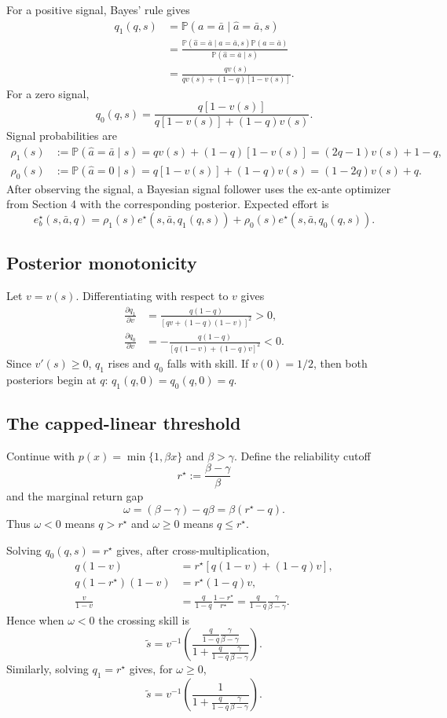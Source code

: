 \documentclass[11pt]{article}
\theoremstyle{tutorial}
\theoremstyle{remark}
\newcommand{\Pp}{\mathbb{P}}
\newcommand{\1}{\mathbb{I}}
\begin{document}
For a positive signal, Bayes' rule gives
\begin{align*}
q_1(q,s)
&=\Pp(a=\bar a\mid\hat a=\bar a,s)\\
&=\frac{\Pp(\hat a=\bar a\mid a=\bar a,s)\Pp(a=\bar a)}
{\Pp(\hat a=\bar a\mid s)}\\
&=\frac{qv(s)}{qv(s)+(1-q)[1-v(s)]}.
\end{align*}
For a zero signal,
\[
q_0(q,s)=\frac{q[1-v(s)]}{q[1-v(s)]+(1-q)v(s)}.
\]
Signal probabilities are
\begin{align*}
\rho_1(s)&:=\Pp(\hat a=\bar a\mid s)=qv(s)+(1-q)[1-v(s)]
=(2q-1)v(s)+1-q,\\
\rho_0(s)&:=\Pp(\hat a=0\mid s)=q[1-v(s)]+(1-q)v(s)
=(1-2q)v(s)+q.
\end{align*}
After observing the signal, a Bayesian signal follower uses the ex-ante optimizer from Section 4 with the
corresponding posterior.  Expected effort is
\[
e_b^\star(s,\bar a,q)=
\rho_1(s)e^\star(s,\bar a,q_1(q,s))+
\rho_0(s)e^\star(s,\bar a,q_0(q,s)).
\]

\subsection{Posterior monotonicity}

Let $v=v(s)$.  Differentiating with respect to $v$ gives
\begin{align*}
\frac{\partial q_1}{\partial v}
&=\frac{q(1-q)}{[qv+(1-q)(1-v)]^2}>0,\\
\frac{\partial q_0}{\partial v}
&=-\frac{q(1-q)}{[q(1-v)+(1-q)v]^2}<0.
\end{align*}
Since $v'(s)\ge0$, $q_1$ rises and $q_0$ falls with skill.  If $v(0)=1/2$, then both posteriors begin at
$q$: $q_1(q,0)=q_0(q,0)=q$.

\subsection{The capped-linear threshold}

Continue with $p(x)=\min\{1,\beta x\}$ and $\beta>\gamma$.  Define the reliability cutoff
\[
r^\star:=\frac{\beta-\gamma}{\beta}
\]
and the marginal return gap
\[
\omega=(\beta-\gamma)-q\beta=\beta(r^\star-q).
\]
Thus $\omega<0$ means $q>r^\star$ and $\omega\ge0$ means $q\le r^\star$.

Solving $q_0(q,s)=r^\star$ gives, after cross-multiplication,
\begin{align*}
q(1-v)&=r^\star[q(1-v)+(1-q)v],\\
q(1-r^\star)(1-v)&=r^\star(1-q)v,\\
\frac{v}{1-v}&=\frac{q}{1-q}\frac{1-r^\star}{r^\star}
=\frac{q}{1-q}\frac{\gamma}{\beta-\gamma}.
\end{align*}
Hence when $\omega<0$ the crossing skill is
\[
\tilde s=v^{-1}\!\left(
\frac{\frac{q}{1-q}\frac{\gamma}{\beta-\gamma}}
{1+\frac{q}{1-q}\frac{\gamma}{\beta-\gamma}}
\right).
\]
Similarly, solving $q_1=r^\star$ gives, for $\omega\ge0$,
\[
\tilde s=v^{-1}\!\left(
\frac{1}{1+\frac{q}{1-q}\frac{\gamma}{\beta-\gamma}}
\right).
\]
\end{document}
